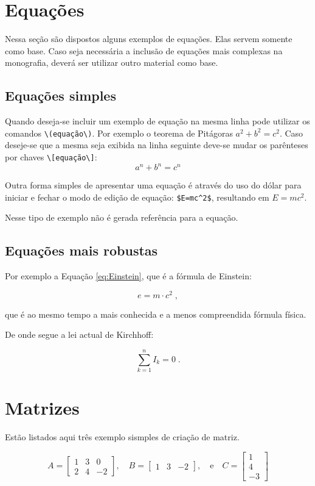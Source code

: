 \section{Equações}


Nessa seção são dispostos alguns exemplos de equações. Elas servem somente como base. 
Caso seja necessária a inclusão de equações mais complexas na monografia, deverá ser utilizar outro material como base.

\subsection{Equações simples}

Quando deseja-se incluir um exemplo de equação na mesma linha pode utilizar os comandos \verb'\(equação\)'. Por exemplo o teorema de Pitágoras \(a^2 + b^2 = c^2\). Caso deseje-se que a mesma seja exibida na linha seguinte deve-se mudar os parênteses por chaves \verb'\[equação\]':  \[ a^n + b^n = c^n \]

Outra forma simples de apresentar uma equação é através do uso do dólar para iniciar e fechar o modo de edição de equação: \verb'$E=mc^2$', resultando em  $E=mc^2$.

Nesse tipo de exemplo não é gerada referência para a equação.

\subsection{Equações mais robustas}
Por exemplo a Equação \ref{eq:Einstein}, que é a fórmula de Einstein:

\begin{equation}
e = m \cdot c^2 \; ,
\label{eq:Einstein}
\end{equation}

que é ao mesmo tempo a mais conhecida e a menos compreendida fórmula física. 

De onde segue a lei actual de Kirchhoff:

\begin{equation}
\sum_{k=1}^{n} I_k = 0 \; .
\end{equation}

\section{Matrizes}

Estão listados aqui três exemplo sismples de criação de matriz. 

$$
A=\left[\begin{array}{rrr}
 1 & 3 &  0\\
 2 & 4 & -2
 \end{array}
 \right],\quad
 B =\left[\begin{array}{ccc}
 1 & 3 & -2
\end{array}\right],
\quad \mbox{e}\quad
C=\left[\begin{array}{r}
1\\4\\-3
\end{array}\right]
$$


